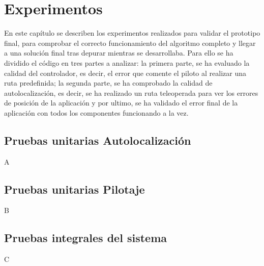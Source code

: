 \chapter{Experimentos}\label{cap.experimentos}
\hspace{1cm} En este capítulo se describen los experimentos realizados para validar el prototipo final, para comprobar el correcto funcionamiento del algoritmo completo y llegar a una solución final tras depurar mientras se desarrollaba. Para ello se ha dividido el código en tres partes a analizar: la primera parte, se ha evaluado la calidad del controlador, es decir, el error que comente el piloto al realizar una ruta predefinida; la segunda parte, se ha comprobado la calidad de autolocalización, es decir, se ha realizado un ruta teleoperada para ver los errores de posición de la aplicación y por ultimo, se ha validado el error final de la aplicación con todos los componentes funcionando a la vez.

\section{Pruebas unitarias Autolocalización}
\hspace{1cm} A

\section{Pruebas unitarias Pilotaje}
\hspace{1cm} B

\section{Pruebas integrales del sistema}
\hspace{1cm} C
